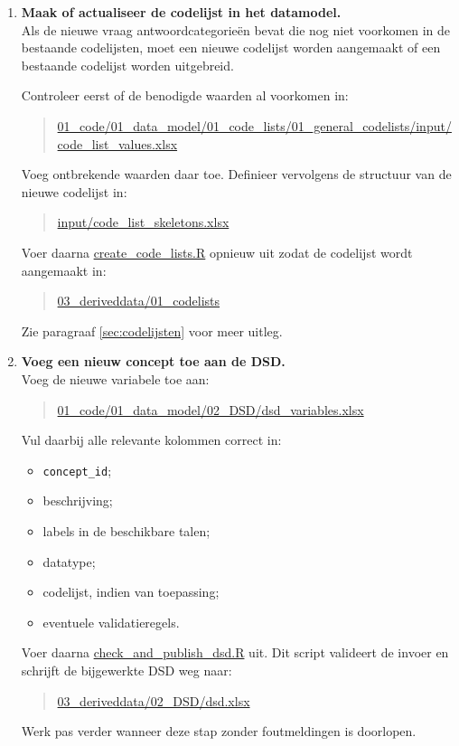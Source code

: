 \documentclass{VSAnote}
\begin{document}
\begin{enumerate}

\item \textbf{Maak of actualiseer de codelijst in het datamodel.}\\
Als de nieuwe vraag antwoordcategorieën bevat die nog niet voorkomen in de bestaande codelijsten, moet een nieuwe codelijst worden aangemaakt of een bestaande codelijst worden uitgebreid.

Controleer eerst of de benodigde waarden al voorkomen in:
\begin{quote}
\url{01_code/01_data_model/01_code_lists/01_general_codelists/input/code_list_values.xlsx}
\end{quote}
Voeg ontbrekende waarden daar toe. Definieer vervolgens de structuur van de nieuwe codelijst in:
\begin{quote}
\url{input/code_list_skeletons.xlsx}
\end{quote}
Voer daarna \url{create_code_lists.R} opnieuw uit zodat de codelijst wordt aangemaakt in:
\begin{quote}
\url{03_deriveddata/01_codelists}
\end{quote}

Zie paragraaf \ref{sec:codelijsten} voor meer uitleg.

\item \textbf{Voeg een nieuw concept toe aan de DSD.}\\
Voeg de nieuwe variabele toe aan:
\begin{quote}
\url{01_code/01_data_model/02_DSD/dsd_variables.xlsx}
\end{quote}

Vul daarbij alle relevante kolommen correct in:
\begin{itemize}[nosep]
\item \verb+concept_id+;
\item beschrijving;
\item labels in de beschikbare talen;
\item datatype;
\item codelijst, indien van toepassing;
\item eventuele validatieregels.
\end{itemize}

Voer daarna \url{check_and_publish_dsd.R} uit. Dit script valideert de invoer en schrijft de bijgewerkte DSD weg naar:
\begin{quote}
\url{03_deriveddata/02_DSD/dsd.xlsx}
\end{quote}
Werk pas verder wanneer deze stap zonder foutmeldingen is doorlopen.


\end{enumerate}
\end{document}
